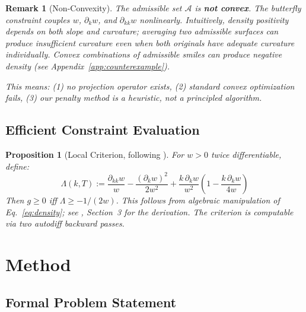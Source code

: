\documentclass[11pt,a4paper]{article}
\newtheorem{proposition}[theorem]{Proposition}
\newtheorem{remark}[theorem]{Remark}
\newcommand{\maturity}{T}
\newcommand{\logstrike}{k}
\newcommand{\totalvar}{w}
\newcommand{\density}{g}
\begin{document}
\begin{remark}[Non-Convexity]
\label{rem:nonconvex}
The admissible set $\mathcal{A}$ is \textbf{not convex}. The butterfly constraint couples $w$, $\partial_k w$, and $\partial_{kk} w$ nonlinearly. Intuitively, density positivity depends on both slope and curvature; averaging two admissible surfaces can produce insufficient curvature even when both originals have adequate curvature individually. Convex combinations of admissible smiles can produce negative density (see Appendix~\ref{app:counterexample}).

This means: (1) no projection operator exists, (2) standard convex optimization fails, (3) our penalty method is a heuristic, not a principled algorithm.
\end{remark}

\subsection{Efficient Constraint Evaluation}

\begin{proposition}[Local Criterion, following \citet{gatheral2014}]
\label{prop:local_criterion}
For $\totalvar > 0$ twice differentiable, define:
\begin{equation}
    \Lambda(\logstrike, \maturity) := \frac{\partial_{\logstrike\logstrike} \totalvar}{\totalvar} - \frac{(\partial_\logstrike \totalvar)^2}{2\totalvar^2} + \frac{\logstrike \, \partial_\logstrike \totalvar}{\totalvar^2}\left(1 - \frac{\logstrike \, \partial_\logstrike \totalvar}{4\totalvar}\right)
\end{equation}
Then $\density \geq 0$ iff $\Lambda \geq -1/(2\totalvar)$. This follows from algebraic manipulation of Eq.~\eqref{eq:density}; see \citet{gatheral2014}, Section~3 for the derivation. The criterion is computable via two autodiff backward passes.
\end{proposition}

\section{Method}
\label{sec:method}

\subsection{Formal Problem Statement}
\end{document}
